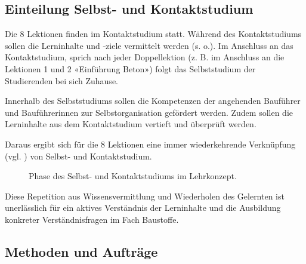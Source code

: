 \documentclass[
11pt,
captions=tableheading,
smallheadings,
headsepline,
footsepline, 
parskip=half-,
]{scrartcl}
\begin{document}
\subsection{Einteilung Selbst- und Kontaktstudium}
Die 8 Lektionen finden im Kontaktstudium statt. Während des Kontaktstudiums sollen die Lerninhalte und -ziele vermittelt werden (s. o.). Im Anschluss an das Kontaktstudium, sprich nach jeder Doppellektion (z. B. im Anschluss an die Lektionen 1 und 2 «Einführung Beton») folgt das Selbststudium der Studierenden bei sich Zuhause.

Innerhalb des Selbststudiums sollen die Kompetenzen der angehenden Bauführer und Bauführerinnen zur Selbstorganisation gefördert werden. Zudem sollen die Lerninhalte aus dem Kontaktstudium vertieft und überprüft werden. 

Daraus ergibt sich für die 8 Lektionen eine immer wiederkehrende Verknüpfung (vgl. ) von Selbst- und Kontaktstudium.

\begin{figure}[h!bt]
	\centering
	\caption{Phase des Selbst- und Kontaktstudiums im Lehrkonzept.}
	\label{fig:Zyklus_Selbst_Kontaktstudium}
\end{figure}

Diese Repetition aus Wissensvermittlung und Wiederholen des Gelernten ist unerlässlich für ein aktives Verständnis der Lerninhalte und die Ausbildung konkreter Verständnisfragen im Fach Baustoffe. 

\subsection{Methoden und Aufträge}
\end{document}
